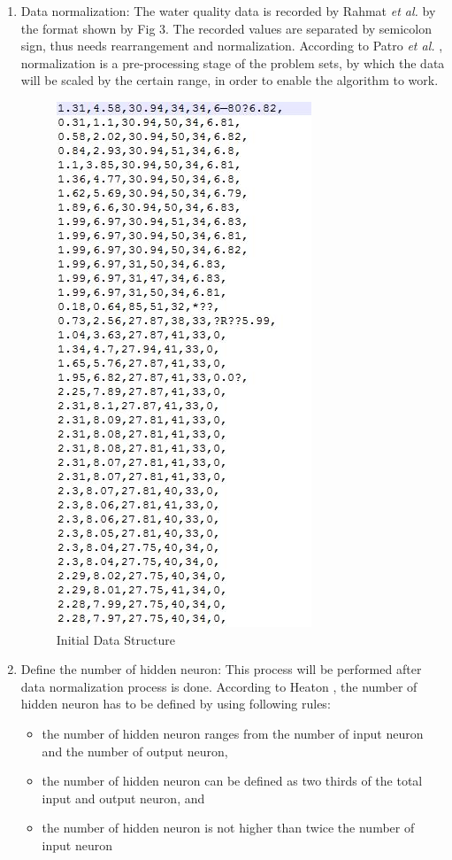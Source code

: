 \documentclass{ws-ijait}
\begin{document}
\begin{enumerate}

\item Data normalization: The water quality data is recorded by Rahmat {\it et al.}\cite{16} by the format shown by Fig 3. The recorded values are separated by semicolon sign, thus needs rearrangement and normalization. According to Patro {\it et al.}\cite{22} , normalization is a pre-processing stage of the problem sets, by which the data will be scaled by the certain range, in order to enable the algorithm to work.

\begin{figure}
\centerline{\includegraphics[scale=0.3]{fig-3.jpg}}
\caption{Initial Data Structure\cite{16}}\label{Fig. 3}
\end{figure}

\item Define the number of hidden neuron: This process will be performed after data normalization process is done. According to Heaton\cite{23} , the number of hidden neuron has to be defined by using following rules:

\begin{itemize}
\item the number of hidden neuron ranges from the number of input neuron and the number of output neuron,
\item the number of hidden neuron can be defined as two thirds of the total input and output neuron, and
\item the number of hidden neuron is not higher than twice the number of input neuron
\end{itemize}


\end{enumerate}
\end{document}
